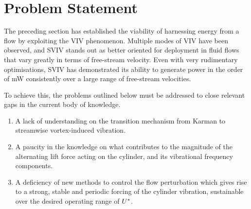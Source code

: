 \documentclass[oneside]{utmthesis}
\begin{document}


\section{Problem Statement}

The preceding section has established the viability of harnessing energy from a flow by exploiting the VIV phenomenon. Multiple modes of VIV have been observed, and SVIV stands out as better oriented for deployment in fluid flows that vary greatly in terms of free-stream velocity. Even with very rudimentary optimisations, SVIV has demonstrated its ability to generate power in the order of mW consistently over a large range of free-stream velocities.


To achieve this, the problems outlined below must be addressed to close relevant gaps in the current body of knowledge.

\begin{enumerate}
  \item A lack of understanding on the transition mechanism from Karman to streamwise vortex-induced vibration.
  \item A paucity in the knowledge on what contributes to the magnitude of the alternating lift force acting on the cylinder, and its vibrational frequency components.
  \item A deficiency of new methods to control the flow perturbation which gives rise to a strong, stable and periodic forcing of the cylinder vibration, sustainable over the desired operating range of $U^{*}$.
\end{enumerate}
\end{document}
